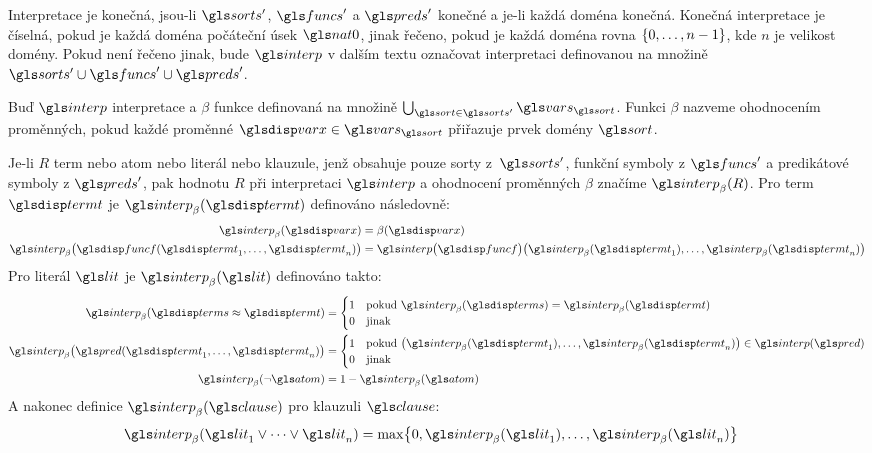 Interpretace je konečná, jsou-li $\sorts'$, $\funcs'$ a $\preds'$
konečné a je-li každá doména konečná.
Konečná interpretace je číselná, pokud je každá doména
počáteční úsek $\nat0$, jinak řečeno, pokud je každá doména rovna
$\{ 0 , \ldots, n - 1 \}$, kde $n$ je velikost domény.
Pokud není řečeno jinak, bude
$\interp$ v dalším textu označovat interpretaci definovanou
na množině $\sorts' \cup \funcs' \cup \preds'$.

Buď $\interp$ interpretace a $\beta$ funkce definovaná na množině
$\bigcup_{\sort \in \sorts'} \vars_\sort$. Funkci $\beta$ nazveme ohodnocením
proměnných, pokud každé proměnné $\var \in \vars_\sort$ přiřazuje
prvek domény $\sort$.

Je-li $R$ term nebo atom nebo literál nebo klauzule, jenž
obsahuje pouze sorty z~$\sorts'$, funkční symboly z $\funcs'$ a
predikátové symboly z $\preds'$, pak
hodnotu $R$ při interpretaci $\interp$ a ohodnocení proměnných
$\beta$ značíme $\interp_\beta(R)$. Pro term $\term$ je $\interp_\beta(\term)$
definováno následovně:
\begin{align*}
\interp_\beta(\var) &= \beta(\var) \\
\interp_\beta\bigl(\func(\term_1 \comdots \term_n)\bigr) &=
  \interp\bigl(\func\bigr)\bigl(\interp_\beta(\term_1) \comdots
    \interp_\beta(\term_n)\bigr)
\end{align*}
Pro literál $\lit$ je $\interp_\beta(\lit)$ definováno takto:
\begin{align*}
\interp_\beta(\termS \approx \term) &=
  \begin{cases}
    1 & \text{pokud } \interp_\beta(\termS) = \interp_\beta(\term) \\
    0 & \text{jinak}
  \end{cases} \\
\interp_\beta\bigl(\pred(\term_1 \comdots \term_n)\bigr) &=
  \begin{cases}
    1 & \text{pokud }
      \bigl(\interp_\beta(\term_1) \comdots \interp_\beta(\term_n)\bigr)
      \in \interp(\pred) \\
    0 & \text{jinak}
  \end{cases} \\
\interp_\beta(\neg \atom) &= 1 - \interp_\beta(\atom)
\end{align*}
A nakonec definice $\interp_\beta(\clause)$ pro klauzuli $\clause$:
\begin{align*}
\interp_\beta(\lit_1 \vee \cdots \vee \lit_n) &=
  \max \bigl\{ 0, \interp_\beta(\lit_1) \comdots \interp_\beta(\lit_n) \bigr\}
\end{align*}

